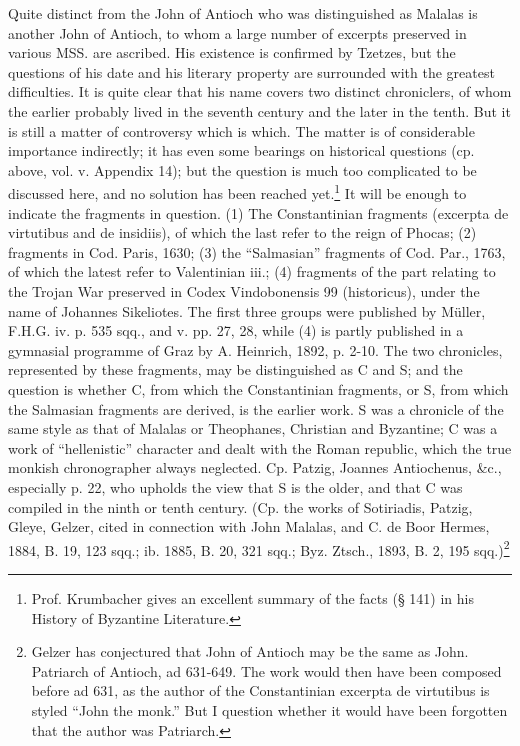 Quite distinct from the John of Antioch who was distinguished as Malalas is another John of Antioch, to whom a large number of excerpts preserved in various MSS. are ascribed. His existence is confirmed by Tzetzes, but the questions of his date and his literary property are surrounded with the greatest difficulties. It is quite clear that his name covers two distinct chroniclers, of whom the earlier probably lived in the seventh century and the later in the tenth. But it is still a matter of controversy which is which. The matter is of considerable importance indirectly; it has even some bearings on historical questions (cp. above, vol. v. Appendix 14); but the question is much too complicated to be discussed here, and no solution has been reached yet.\footnote{Prof. Krumbacher gives an excellent summary of the facts (§ 141) in his History of Byzantine Literature.} It will be enough to indicate the fragments in question. (1) The Constantinian fragments (excerpta de virtutibus and de insidiis), of which the last refer to the reign of Phocas; (2) fragments in Cod. Paris, 1630; (3) the \texthebrew{“}Salmasian\texthebrew{}” fragments of Cod. Par., 1763, of which the latest refer to Valentinian iii.; (4) fragments of the part relating to the Trojan War preserved in Codex Vindobonensis 99 (historicus), under the name of Johannes Sikeliotes. The first three groups were published by Müller, F.H.G. iv. p. 535 sqq., and v. pp. 27, 28, while (4) is partly published in a gymnasial programme of Graz by A. Heinrich, 1892, p. 2-10. The two chronicles, represented by these fragments, may be distinguished as C and S; and the question is whether C, from which the Constantinian fragments, or S, from which the Salmasian fragments are derived, is the earlier work. S was a chronicle of the same style as that of Malalas or Theophanes, Christian and Byzantine; C was a work of \texthebrew{“}hellenistic\texthebrew{}” character and dealt with the Roman republic, which the true monkish chronographer always neglected. Cp. Patzig, Joannes Antiochenus, \&c., especially p. 22, who upholds the view that S is the older, and that C was compiled in the ninth or tenth century. (Cp. the works of Sotiriadis, Patzig, Gleye, Gelzer, cited in connection with John Malalas, and C. de Boor Hermes, 1884, B. 19, 123 sqq.; ib. 1885, B. 20, 321 sqq.; Byz. Ztsch., 1893, B. 2, 195 sqq.)\footnote{Gelzer has conjectured that John of Antioch may be the same as John. Patriarch of Antioch, ad 631-649. The work would then have been composed before ad 631, as the author of the Constantinian excerpta de virtutibus is styled \texthebrew{“}John the monk.\texthebrew{}” But I question whether it would have been forgotten that the author was Patriarch.}

